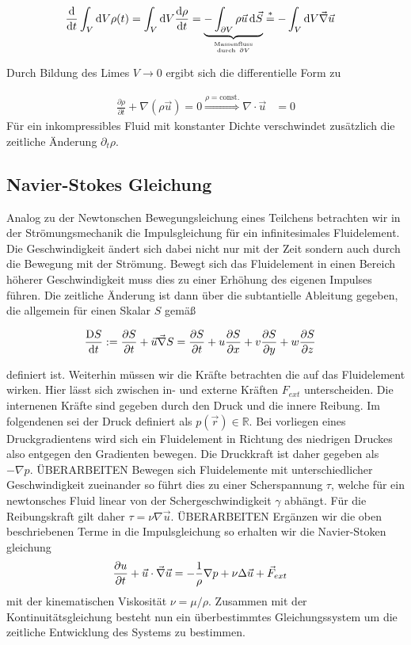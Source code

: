 \begin{align}
    \frac{\dif}{\dif t} \int_{V}\dif V \rho(t) =  \int_{V}\dif V \frac{\dif \rho}{\dif t}  &= \underbrace{-\int_{\partial V}
     \rho \vec{u}\dif \vec{S}}_{\mathrm{Massenfluss} \atop \mathrm{durch \ } \partial V} \overset{*}{=} -\int_V \dif V \vec{\nabla}\vec{u}
\end{align}

Durch Bildung des Limes $V\rightarrow 0$ ergibt sich die differentielle Form zu

\begin{align}
     \frac{\partial \rho}{\partial t}  + \nabla(\rho \vec{u}) = 0 \overset{\rho = \mathrm{const.}}{\Rightarrow} \nabla \cdot \vec{u} &= 0
\end{align}
Für ein inkompressibles Fluid mit konstanter Dichte verschwindet zusätzlich die zeitliche Änderung $\partial_t \rho$.

\subsection{Navier-Stokes Gleichung}

Analog zu der Newtonschen Bewegungsleichung eines Teilchens betrachten wir in der Strömungsmechanik die Impulsgleichung für ein infinitesimales Fluidelement.
Die Geschwindigkeit ändert sich dabei nicht nur mit der Zeit sondern auch durch die Bewegung mit der Strömung. Bewegt sich das Fluidelement in einen
Bereich höherer Geschwindigkeit muss dies zu einer Erhöhung des eigenen Impulses führen.
Die zeitliche Änderung ist dann über die subtantielle Ableitung gegeben, die allgemein für einen Skalar $S$ gemäß

\begin{align}
    \frac{\Dif S}{\dif t} &:= \pdn[S]{t} + \vec{u}\vec{\nabla}S = \pdn[S]{t} + u\pdn[S]{x} + v\pdn[S]{y}+ w\pdn[S]{z}
\end{align}

definiert ist.
Weiterhin müssen wir die Kräfte betrachten die auf das Fluidelement wirken. Hier lässt sich zwischen in- und externe Kräften $F_{ext}$ unterscheiden.
Die internenen Kräfte sind gegeben durch den Druck und die innere Reibung.
Im folgendenen sei der Druck definiert als $p(\vec{r}) \in \mathbb{R}$. Bei vorliegen eines Druckgradientens wird sich ein Fluidelement in Richtung des niedrigen Druckes
also entgegen den Gradienten bewegen. Die Druckkraft ist daher gegeben als $-\nabla p$.
ÜBERARBEITEN
Bewegen sich Fluidelemente mit unterschiedlicher Geschwindigkeit zueinander so führt dies zu einer Scherspannung $\tau$, welche
für ein newtonsches Fluid linear von der Schergeschwindigkeit $\gamma$ abhängt. Für die Reibungskraft gilt daher  $\tau = \nu \nabla\vec{u}$.
ÜBERARBEITEN
Ergänzen wir die oben beschriebenen Terme in die Impulsgleichung so erhalten wir die Navier-Stoken gleichung
\begin{align}
    \pdn[u]{t} + \vec{u} \cdot \vec{\nabla} \vec{u} &= - \frac{1}{\rho} \nabla p + \nu \Delta \vec{u} + \vec{F}_{ext}
\end{align}
mit der kinematischen Viskosität $\nu = \mu /\rho$.
Zusammen mit der Kontinuitätsgleichung besteht nun ein überbestimmtes Gleichungssystem um die
zeitliche Entwicklung des Systems zu bestimmen.

